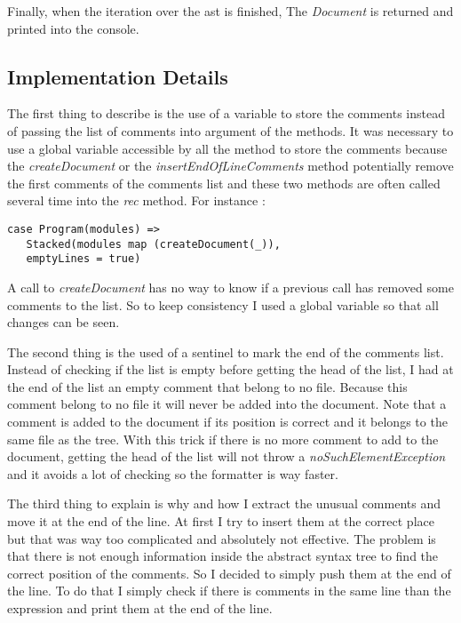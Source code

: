 Finally, when the iteration over the ast is finished, The \emph{Document} is returned and printed into the console.



\subsection{Implementation Details}
The first thing to describe is the use of a variable to store the comments instead of passing the list of comments into argument of the methods. It was necessary to use a global variable accessible by all the method to store the comments because the \emph{createDocument} or the \emph{insertEndOfLineComments} method potentially remove the first comments of the comments list and these two methods are often called several time into the \emph{rec} method. For instance : 

\begin{lstlisting}
case Program(modules) =>
   Stacked(modules map (createDocument(_)), 
   emptyLines = true)
\end{lstlisting}

A call to \emph{createDocument} has no way to know if a previous call has removed some comments to the list. So to keep consistency I used a global variable so that all changes can be seen.

The second thing is the used of a sentinel to mark the end of the comments list. Instead of checking if the list is empty before getting the head of the list, I had at the end of the list an empty comment that belong to no file. Because this comment belong to no file it will never be added into the document. Note that a comment is added to the document if its position is correct and it belongs to the same file as the tree. With this trick if there is no more comment to add to the document, getting the head of the list will not throw a \emph{noSuchElementException} and it avoids a lot of checking so the formatter is way faster. 

The third thing to explain is why and how I extract the unusual comments and move it at the end of the line. At first I try to insert them at the correct place but that was way too complicated and absolutely not effective. The problem is that there is not enough information inside the abstract syntax tree to find the correct position of the comments. So I decided to simply push them at the end of the line. To do that I simply check if there is comments in the same line than the expression and print them at the end of the line.

